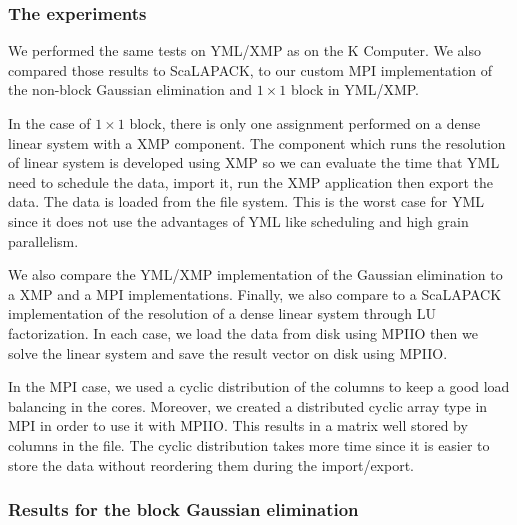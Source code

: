 \subsubsection{The experiments}
We performed the same tests on YML/XMP as on the K Computer.
We also compared those results to ScaLAPACK, to our custom MPI implementation of the non-block Gaussian elimination and $1\times 1$ block in YML/XMP.

In the case of $1\times 1$ block, there is only one assignment performed on a dense linear system with a XMP component.
The component which runs the resolution of linear system is developed using XMP so we can evaluate the time that YML need to schedule the data, import it, run the XMP application then export the data.
The data is loaded from the file system.
This is the worst case for YML since it does not use the advantages of YML like scheduling and high grain parallelism.

We also compare the YML/XMP implementation of the Gaussian elimination to a XMP and a MPI implementations.
Finally, we also compare to a ScaLAPACK implementation of the resolution of a dense linear system through LU factorization.
In each case, we load the data from disk using MPIIO then we solve the linear system and save the result vector on disk using MPIIO.

In the MPI case, we used a cyclic distribution of the columns to keep a good load balancing in the cores.
Moreover, we created a distributed cyclic array type in MPI in order to use it with MPIIO.
This results in a matrix well stored by columns in the file.
The cyclic distribution takes more time since it is easier to store the data without reordering them during the import/export.

\subsubsection{Results for the block Gaussian elimination}

